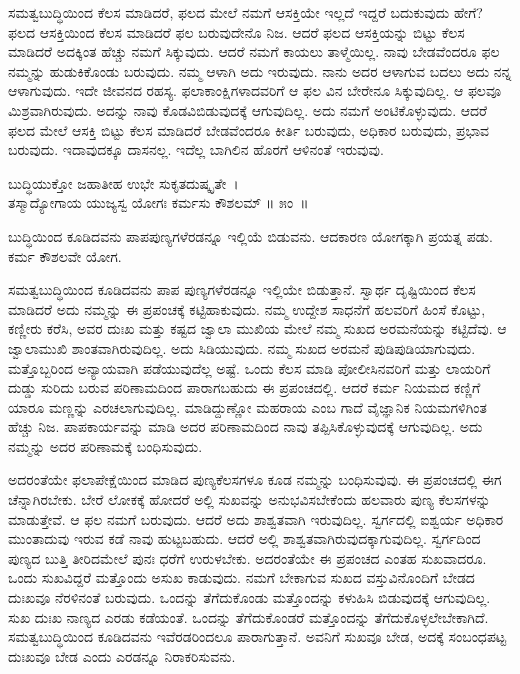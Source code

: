 ಸಮತ್ವಬುದ್ಧಿಯಿಂದ ಕೆಲಸ ಮಾಡಿದರೆ, ಫಲದ ಮೇಲೆ ನಮಗೆ ಆಸಕ್ತಿಯೇ ಇಲ್ಲದೆ ಇದ್ದರೆ ಬದುಕುವುದು ಹೇಗೆ? ಫಲದ ಆಸಕ್ತಿಯಿಂದ ಕೆಲಸ ಮಾಡಿದರೆ ಫಲ ಬರುವುದೇನೊ ನಿಜ. ಆದರೆ ಫಲದ ಆಸಕ್ತಿಯನ್ನು ಬಿಟ್ಟು ಕೆಲಸ ಮಾಡಿದರೆ ಅದಕ್ಕಿಂತ ಹೆಚ್ಚು ನಮಗೆ ಸಿಕ್ಕುವುದು. ಆದರೆ ನಮಗೆ ಕಾಯಲು ತಾಳ್ಮೆಯಿಲ್ಲ. ನಾವು ಬೇಡವೆಂದರೂ ಫಲ ನಮ್ಮನ್ನು ಹುಡುಕಿಕೊಂಡು ಬರುವುದು. ನಮ್ಮ ಆಳಾಗಿ ಅದು ಇರುವುದು. ನಾನು ಅದರ ಆಳಾಗುವ ಬದಲು ಅದು ನನ್ನ ಆಳಾಗುವುದು. ಇದೇ ಜೀವನದ ರಹಸ್ಯ. ಫಲಾಕಾಂಕ್ಷಿಗಳಾದವರಿಗೆ ಆ ಫಲ ವಿನ ಬೇರೇನೂ ಸಿಕ್ಕುವುದಿಲ್ಲ. ಆ ಫಲವೂ ಮಿಶ್ರವಾಗಿರುವುದು. ಅದನ್ನು ನಾವು ಕೊಡವಿಬಿಡುವುದಕ್ಕೆ ಆಗುವುದಿಲ್ಲ. ಅದು ನಮಗೆ ಅಂಟಿಕೊಳ್ಳುವುದು. ಆದರೆ ಫಲದ ಮೇಲೆ ಆಸಕ್ತಿ ಬಿಟ್ಟು ಕೆಲಸ ಮಾಡಿದರೆ ಬೇಡವೆಂದರೂ ಕೀರ್ತಿ ಬರುವುದು, ಅಧಿಕಾರ ಬರುವುದು, ಪ್ರಭಾವ ಬರುವುದು. ಇದಾವುದಕ್ಕೂ ದಾಸನಲ್ಲ. ಇದೆಲ್ಲ ಬಾಗಿಲಿನ ಹೊರಗೆ ಆಳಿನಂತೆ ಇರುವುವು.

\begin{shloka}
ಬುದ್ಧಿಯುಕ್ತೋ ಜಹಾತೀಹ ಉಭೇ ಸುಕೃತದುಷ್ಕೃತೇ~।\\ತಸ್ಮಾದ್ಯೋಗಾಯ ಯುಜ್ಯಸ್ವ ಯೋಗಃ ಕರ್ಮಸು ಕೌಶಲಮ್ \hfill॥ ೫ಂ~॥
\end{shloka}

\begin{artha}
ಬುದ್ಧಿಯಿಂದ ಕೂಡಿದವನು ಪಾಪಪುಣ್ಯಗಳೆರಡನ್ನೂ ಇಲ್ಲಿಯೆ ಬಿಡುವನು. ಆದಕಾರಣ ಯೋಗಕ್ಕಾಗಿ ಪ್ರಯತ್ನ ಪಡು. ಕರ್ಮ ಕೌಶಲವೇ ಯೋಗ.
\end{artha}

ಸಮತ್ವಬುದ್ಧಿಯಿಂದ ಕೂಡಿದವನು ಪಾಪ ಪುಣ್ಯಗಳೆರಡನ್ನೂ ಇಲ್ಲಿಯೇ ಬಿಡುತ್ತಾನೆ. ಸ್ವಾರ್ಥ ದೃಷ್ಟಿಯಿಂದ ಕೆಲಸ ಮಾಡಿದರೆ ಅದು ನಮ್ಮನ್ನು ಈ ಪ್ರಪಂಚಕ್ಕೆ ಕಟ್ಟಿಹಾಕುವುದು. ನಮ್ಮ ಉದ್ದೇಶ ಸಾಧನೆಗೆ ಹಲವರಿಗೆ ಹಿಂಸೆ ಕೊಟ್ಟು, ಕಣ್ಣೀರು ಕರೆಸಿ, ಅವರ ದುಃಖ ಮತ್ತು ಕಷ್ಟದ ಜ್ವಾಲಾ ಮುಖಿಯ ಮೇಲೆ ನಮ್ಮ ಸುಖದ ಅರಮನೆಯನ್ನು ಕಟ್ಟಿದೆವು. ಆ ಜ್ವಾಲಾಮುಖಿ ಶಾಂತವಾಗಿರುವುದಿಲ್ಲ. ಅದು ಸಿಡಿಯುವುದು. ನಮ್ಮ ಸುಖದ ಅರಮನೆ ಪುಡಿಪುಡಿಯಾಗುವುದು. ಮತ್ತೊಬ್ಬರಿಂದ ಅನ್ಯಾಯವಾಗಿ ಪಡೆಯುವುದೆಲ್ಲ ಅಷ್ಟೆ. ಒಂದು ಕೆಲಸ ಮಾಡಿ ಪೋಲೀಸಿನವರಿಗೆ ಮತ್ತು ಲಾಯರಿಗೆ ದುಡ್ಡು ಸುರಿದು ಬರುವ ಪರಿಣಾಮದಿಂದ ಪಾರಾಗಬಹುದು ಈ ಪ್ರಪಂಚದಲ್ಲಿ. ಆದರೆ ಕರ್ಮ ನಿಯಮದ ಕಣ್ಣಿಗೆ ಯಾರೂ ಮಣ್ಣನ್ನು ಎರಚಲಾಗುವುದಿಲ್ಲ. ಮಾಡಿದ್ದುಣ್ಣೋ ಮಹರಾಯ ಎಂಬ ಗಾದೆ ವೈಜ್ಞಾನಿಕ ನಿಯಮಗಳಿಗಿಂತ ಹೆಚ್ಚು ನಿಜ. ಪಾಪಕಾರ್ಯವನ್ನು ಮಾಡಿ ಅದರ ಪರಿಣಾಮದಿಂದ ನಾವು ತಪ್ಪಿಸಿಕೊಳ್ಳುವುದಕ್ಕೆ ಆಗುವುದಿಲ್ಲ. ಅದು ನಮ್ಮನ್ನು ಅದರ ಪರಿಣಾಮಕ್ಕೆ ಬಂಧಿಸುವುದು.

ಅದರಂತೆಯೇ ಫಲಾಪೇಕ್ಷೆಯಿಂದ ಮಾಡಿದ ಪುಣ್ಯಕೆಲಸಗಳೂ ಕೂಡ ನಮ್ಮನ್ನು ಬಂಧಿಸು\-ವುವು. ಈ ಪ್ರಪಂಚದಲ್ಲಿ ಈಗ ಚೆನ್ನಾಗಿರಬೇಕು. ಬೇರೆ ಲೋಕಕ್ಕೆ ಹೋದರೆ ಅಲ್ಲಿ ಸುಖವನ್ನು ಅನುಭವಿಸಬೇಕೆಂದು ಹಲವಾರು ಪುಣ್ಯ ಕೆಲಸಗಳನ್ನು ಮಾಡುತ್ತೇವೆ. ಆ ಫಲ ನಮಗೆ ಬರುವುದು. ಆದರೆ ಅದು ಶಾಶ್ವತವಾಗಿ ಇರುವುದಿಲ್ಲ. ಸ್ವರ್ಗದಲ್ಲಿ ಐಶ್ವರ್ಯ ಅಧಿಕಾರ ಮುಂತಾದುವು ಇರುವ ಕಡೆ ನಾವು ಹುಟ್ಟಬಹುದು. ಆದರೆ ಅಲ್ಲಿ ಶಾಶ್ವತವಾಗಿರುವುದಕ್ಕಾಗುವುದಿಲ್ಲ. ಸ್ವರ್ಗದಿಂದ ಪುಣ್ಯದ ಬುತ್ತಿ ತೀರಿದಮೇಲೆ ಪುನಃ ಧರೆಗೆ ಉರುಳಬೇಕು. ಅದರಂತೆಯೇ ಈ ಪ್ರಪಂಚದ ಎಂತಹ ಸುಖವಾದರೂ. ಒಂದು ಸುಖವಿದ್ದರೆ ಮತ್ತೊಂದು ಅಸುಖ ಕಾಡುವುದು. ನಮಗೆ ಬೇಕಾಗುವ ಸುಖದ ವಸ್ತುವಿನೊಂದಿಗೆ ಬೇಡದ ದುಃಖವೂ ನೆರಳಿನಂತೆ ಬರುವುದು. ಒಂದನ್ನು ತೆಗೆದುಕೊಂಡು ಮತ್ತೊಂದನ್ನು ಕಳುಹಿಸಿ ಬಿಡುವುದಕ್ಕೆ ಆಗುವುದಿಲ್ಲ. ಸುಖ ದುಃಖ ನಾಣ್ಯದ ಎರಡು ಕಡೆಯಂತೆ. ಒಂದನ್ನು ತೆಗೆದುಕೊಂಡರೆ ಮತ್ತೊಂದನ್ನು ತೆಗೆದುಕೊಳ್ಳಲೇಬೇಕಾಗಿದೆ. ಸಮತ್ವಬುದ್ಧಿಯಿಂದ ಕೂಡಿದವನು ಇವೆರಡರಿಂದಲೂ ಪಾರಾಗುತ್ತಾನೆ. ಅವನಿಗೆ ಸುಖವೂ ಬೇಡ, ಅದಕ್ಕೆ ಸಂಬಂಧಪಟ್ಟ ದುಃಖವೂ ಬೇಡ ಎಂದು ಎರಡನ್ನೂ ನಿರಾಕರಿಸುವನು.

